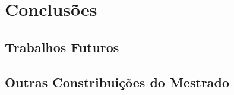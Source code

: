 \chapter{Conclusões}
\label{cap:conclusoes}

\section{Trabalhos Futuros}


\section{Outras Constribuições do Mestrado}
